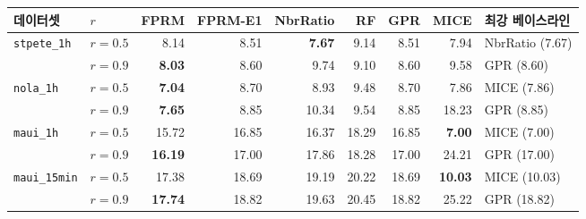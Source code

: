 \begin{tabular}{llrrrrrrl}
\toprule
데이터셋 & $r$ & FPRM & FPRM-E1 & NbrRatio & RF & GPR & MICE & 최강 베이스라인 \\
\midrule
\texttt{stpete\_1h} & $r{=}0.5$ & 8.14 & 8.51 & \textbf{7.67} & 9.14 & 8.51 & 7.94 & NbrRatio (7.67) \\
 & $r{=}0.9$ & \textbf{8.03} & 8.60 & 9.74 & 9.10 & 8.60 & 9.58 & GPR (8.60) \\
\midrule
\texttt{nola\_1h} & $r{=}0.5$ & \textbf{7.04} & 8.70 & 8.93 & 9.48 & 8.70 & 7.86 & MICE (7.86) \\
 & $r{=}0.9$ & \textbf{7.65} & 8.85 & 10.34 & 9.54 & 8.85 & 18.23 & GPR (8.85) \\
\midrule
\texttt{maui\_1h} & $r{=}0.5$ & 15.72 & 16.85 & 16.37 & 18.29 & 16.85 & \textbf{7.00} & MICE (7.00) \\
 & $r{=}0.9$ & \textbf{16.19} & 17.00 & 17.86 & 18.28 & 17.00 & 24.21 & GPR (17.00) \\
\midrule
\texttt{maui\_15min} & $r{=}0.5$ & 17.38 & 18.69 & 19.19 & 20.22 & 18.69 & \textbf{10.03} & MICE (10.03) \\
 & $r{=}0.9$ & \textbf{17.74} & 18.82 & 19.63 & 20.45 & 18.82 & 25.22 & GPR (18.82) \\
\bottomrule
\end{tabular}
